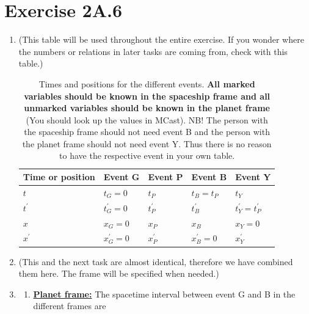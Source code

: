 \documentclass[a4paper,10pt,english]{article}
\begin{document}
\section*{Exercise 2A.6}

\begin{enumerate}

\item (This table will be used throughout the entire exercise. If you wonder where the numbers or relations in later tasks are coming from, check with this table.)

\begin{table}[H]
  \begin{center}
    \begin{tabular}{| l | l | l | l | l |}
   	\hline
	 Time or position & Event G & Event P & Event B & Event Y\\ \hline
	 $t$ & $t_{G}=0$ & $t_{P}$ & $t_{B}=t_{P}$ & $t_{Y}$\\ \hline
	 $t^{\prime}$ & $t^{\prime}_{G}=0$ & $t_{P}^{\prime}$ & $t_{B}^{\prime}$ & $t^{\prime}_{Y}=t^{\prime}_{P}$\\ \hline
	 $x$ & $x_{G}=0$ & $x_{P}$ & $x_{B}$ & $x_{Y}=0$\\ \hline
	 $x^{\prime}$ & $x^{\prime}_{G}=0$ & $x_{P}^{\prime}$ & $x_{B}^{\prime}=0$ & $x^{\prime}_{Y}$\\ \hline
	\end{tabular}
    \caption{Times and positions for the different events. \textbf{All marked variables should be known in the spaceship frame and all unmarked variables should be known in the planet frame} (You should look up the values in MCast). NB! The person with the spaceship frame should not need event B and the person with the planet frame should not need event Y. Thus there is no reason to have the respective event in your own table.}
    \label{tabel:ex_2A_6}
  \end{center}
\end{table}
\FloatBarrier

\item (This and the next task are almost identical, therefore we have combined them here. The frame will be specified when needed.)
\item 
\begin{enumerate}

\item \underline{\bf{Planet frame:}} The spacetime interval between event G and B in the different frames are


\end{enumerate}
\end{enumerate}
\end{document}
